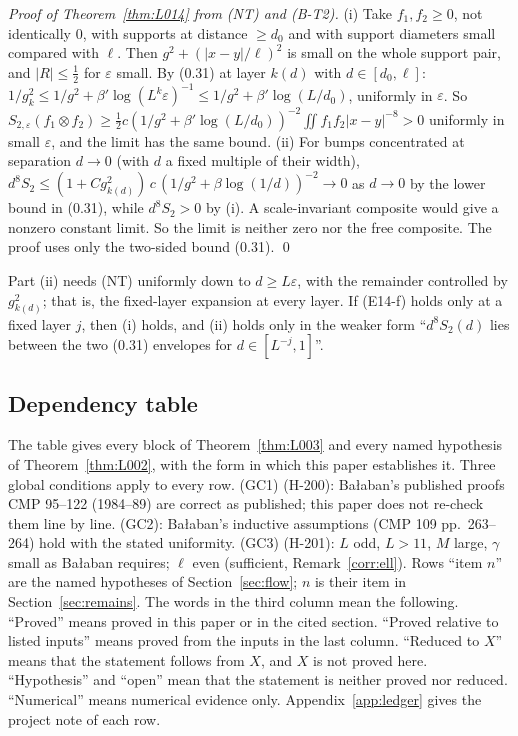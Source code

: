 \emph{Proof of Theorem~\ref{thm:L014} from (NT) and (B-T2).}
(i) Take $f_1,f_2\ge0$, not identically $0$, with supports at distance $\ge d_0$ and with support diameters small compared with $\ell$. Then $g^2+(|x-y|/\ell)^2$ is small on the whole support pair, and $|R|\le\tfrac12$ for $\varepsilon$ small. By (0.31) at layer $k(d)$ with $d\in[d_0,\ell]$: $1/g_k^2\le1/g^2+\beta'\log(L^k\varepsilon)^{-1}\le1/g^2+\beta'\log(L/d_0)$, uniformly in $\varepsilon$. So $S_{2,\varepsilon}(f_1\otimes f_2)\ge\tfrac12c(1/g^2+\beta'\log(L/d_0))^{-2}\iint f_1f_2|x-y|^{-8}>0$ uniformly in small $\varepsilon$, and the limit has the same bound.
(ii) For bumps concentrated at separation $d\to0$ (with $d$ a fixed multiple of their width), $d^8S_2\le(1+Cg_{k(d)}^2)\,c\,(1/g^2+\beta\log(1/d))^{-2}\to0$ as $d\to0$ by the lower bound in (0.31), while $d^8S_2>0$ by (i). A scale-invariant composite would give a nonzero constant limit. So the limit is neither zero nor the free composite. The proof uses only the two-sided bound (0.31). \qed

\begin{remark}
Part (ii) needs (NT) uniformly down to $d\ge L\varepsilon$, with the remainder controlled by $g_{k(d)}^2$; that is, the fixed-layer expansion at every layer. If (E14-f) holds only at a fixed layer $j$, then (i) holds, and (ii) holds only in the weaker form ``$d^8S_2(d)$ lies between the two (0.31) envelopes for $d\in[L^{-j},1]$''.
\end{remark}

\subsection{Dependency table}\label{sec:deptable}
The table gives every block of Theorem~\ref{thm:L003} and every named hypothesis of Theorem~\ref{thm:L002}, with the form in which this paper establishes it. Three global conditions apply to every row. (GC1) (H-200): Ba{\l}aban's published proofs CMP 95--122 (1984--89) are correct as published; this paper does not re-check them line by line. (GC2): Ba{\l}aban's inductive assumptions (CMP 109 pp.\ 263--264) hold with the stated uniformity. (GC3) (H-201): $L$ odd, $L>11$, $M$ large, $\gamma$ small as Ba{\l}aban requires; $\ell$ even (sufficient, Remark~\ref{corr:ell}). Rows ``item $n$'' are the named hypotheses of Section~\ref{sec:flow}; $n$ is their item in Section~\ref{sec:remains}. The words in the third column mean the following. ``Proved'' means proved in this paper or in the cited section. ``Proved relative to listed inputs'' means proved from the inputs in the last column. ``Reduced to $X$'' means that the statement follows from $X$, and $X$ is not proved here. ``Hypothesis'' and ``open'' mean that the statement is neither proved nor reduced. ``Numerical'' means numerical evidence only. Appendix~\ref{app:ledger} gives the project note of each row.

